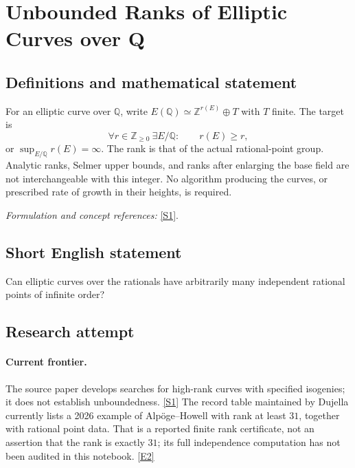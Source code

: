 \documentclass[11pt,a4paper]{article}
\newcommand{\Z}{\mathbb{Z}}
\newcommand{\Q}{\mathbb{Q}}
\newcommand{\sref}[2]{\hyperlink{source:#1:#2}{[S#2]}}
\newcommand{\eref}[2]{\hyperlink{extra:#1:#2}{[E#2]}}
\newif\ifshowcatalogue
\newcommand{\cataloguescope}[1]{\ifshowcatalogue
 \paragraph{Exact scope in the supplied catalogue.}
 \begin{quote}\small #1\end{quote}\fi}
\numberwithin{equation}{section}
\begin{document}
\setcounter{section}{106}
\clearpage
\section{\texorpdfstring{Unbounded Ranks of Elliptic Curves over Q}{Unbounded Ranks of Elliptic Curves over Q}}\label{107}
\subsection{Definitions and mathematical statement}
For an elliptic curve over $\Q$, write $E(\Q)\simeq\Z^{r(E)}\oplus T$ with $T$ finite. The target is
\[
 \forall r\in\Z_{\ge0}\ \exists E/\Q:\qquad r(E)\ge r,
\]
or $\sup_{E/\Q}r(E)=\infty$. The rank is that of the actual rational-point group. Analytic ranks, Selmer upper bounds, and ranks after enlarging the base field are not interchangeable with this integer. No algorithm producing the curves, or prescribed rate of growth in their heights, is required.
\par\smallskip\textit{Formulation and concept references:} \sref{107}{1}.
\cataloguescope{Prove that for EVERY nonnegative integer r there is SOME elliptic curve E/Q whose actual Mordell-Weil group E(Q) has Z-rank at least r. The base field is exactly Q and rank means the free abelian rank in Mordell's theorem, not analytic rank, a Selmer bound or random-matrix corank. Thus the set of actual ranks of ALL elliptic curves over Q is unbounded. Counting one representative per Q-isomorphism class does not alter this existence question. No effective construction, specified family, uniform curve-producing algorithm or predetermined rate of growth is required.}
\subsection{Short English statement}
Can elliptic curves over the rationals have arbitrarily many independent rational points of infinite order?
\subsection{Research attempt}

\paragraph{Current frontier.}
The source paper develops searches for high-rank curves with specified
isogenies; it does not establish unboundedness. \sref{107}{1}
The record table maintained by Dujella currently lists a 2026 example of
Alp\"oge--Howell with rank at least $31$, together with rational point data.
That is a reported finite rank certificate, not an assertion that the rank
is exactly $31$; its full independence computation has not been audited in
this notebook. \eref{107}{2}
\end{document}
